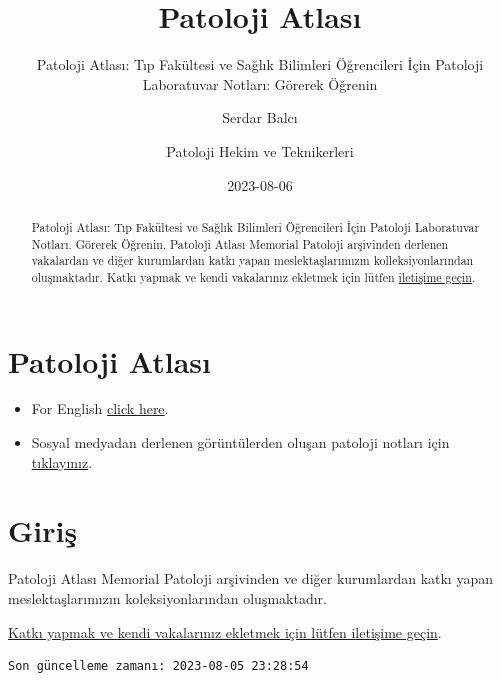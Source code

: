 \documentclass[
  letterpaper,
  DIV=11,
  numbers=noendperiod]{scrreprt}
\title{Patoloji Atlası}
\subtitle{Patoloji Atlası: Tıp Fakültesi ve Sağlık Bilimleri Öğrencileri
İçin Patoloji Laboratuvar Notları: Görerek Öğrenin}
\author{Serdar Balcı \and Patoloji Hekim ve Teknikerleri}
\date{2023-08-06}
\renewcommand*\contentsname{Içindekiler}
\newcommand\contentsname{Içindekiler}
\begin{document}
\maketitle
\begin{abstract}
Patoloji Atlası: Tıp Fakültesi ve Sağlık Bilimleri Öğrencileri İçin
Patoloji Laboratuvar Notları. Görerek Öğrenin. Patoloji Atlası Memorial
Patoloji arşivinden derlenen vakalardan ve diğer kurumlardan katkı yapan
meslektaşlarımızın kolleksiyonlarından oluşmaktadır. Katkı yapmak ve
kendi vakalarınız ekletmek için lütfen
\href{https://www.patolojiatlasi.com/katki.html}{iletişime geçin}.
\end{abstract}
\renewcommand*\contentsname{İçindekiler}
{
\hypersetup{linkcolor=}
\setcounter{tocdepth}{2}
\tableofcontents
}

\hypertarget{sec-patoloji-atlasi}{%
\chapter*{Patoloji Atlası}\label{sec-patoloji-atlasi}}


\begin{itemize}
\item
  For English \href{https://www.histopathologyatlas.com/}{click here}.
\item
  Sosyal medyadan derlenen görüntülerden oluşan patoloji notları için
  \href{https://www.patolojinotlari.com/}{tıklayınız}.\\
\end{itemize}


\hypertarget{sec-giris}{%
\chapter*{Giriş}\label{sec-giris}}


Patoloji Atlası Memorial Patoloji arşivinden ve diğer kurumlardan katkı
yapan meslektaşlarımızın koleksiyonlarından oluşmaktadır.

\href{https://www.patolojiatlasi.com/katki.html}{Katkı yapmak ve kendi
vakalarınız ekletmek için lütfen iletişime geçin}.

\begin{verbatim}
Son güncelleme zamanı: 2023-08-05 23:28:54
\end{verbatim}
\end{document}
